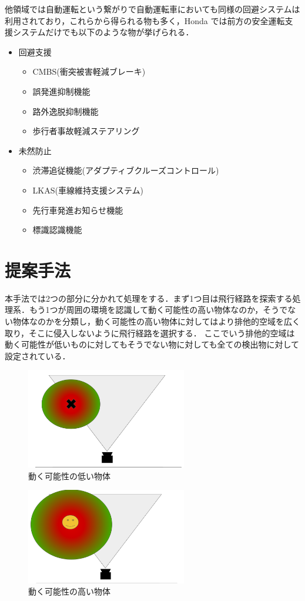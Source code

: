 \documentclass[a4j,10pt]{jsarticle}
\begin{document}
他領域では自動運転という繋がりで自動運転車においても同様の回避システムは利用されており，これらから得られる物も多く，Honda\cite{Honda} では前方の安全運転支援システムだけでも以下のような物が挙げられる．

\begin{itemize}
\item 回避支援
  \begin{itemize}
    \item CMBS(衝突被害軽減ブレーキ)
    \item 誤発進抑制機能
    \item 路外逸脱抑制機能
    \item 歩行者事故軽減ステアリング
  \end{itemize}
\item 未然防止
  \begin{itemize}
    \item 渋滞追従機能(アダプティブクルーズコントロール)
    \item LKAS(車線維持支援システム)
    \item 先行車発進お知らせ機能
    \item 標識認識機能
  \end{itemize}
\end{itemize}


\section{提案手法}
本手法では2つの部分に分かれて処理をする．まず1つ目は飛行経路を探索する処理系．もう1つが周囲の環境を認識して動く可能性の高い物体なのか，そうでない物体なのかを分類し，動く可能性の高い物体に対してはより排他的空域を広く取り，そこに侵入しないように飛行経路を選択する．
ここでいう排他的空域は動く可能性が低いものに対してもそうでない物に対しても全ての検出物に対して設定されている．

\begin{figure}[htbp]
  \includegraphics[width=7cm]{figure1.png}
  \caption{動く可能性の低い物体}
\end{figure}
\begin{figure}[htbp]
  \includegraphics[width=7cm]{figure2.png}
  \caption{動く可能性の高い物体}
\end{figure}
\end{document}
